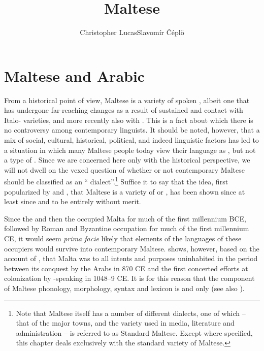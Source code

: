 \documentclass[output=paper]{langsci/langscibook}
\title{Maltese}
\author{Christopher Lucas\affiliation{SOAS University of London}\lastand Slavomír Čéplö\affiliation{Institute of Oriental Studies, Slovak Academy of Sciences/IMAFO Abteilung Byzanzforschung, Österreichische Akademie der Wissenschaften}}
\begin{document}
\maketitle
\section{Maltese and Arabic} %
From a historical point of view, Maltese is a variety of spoken , albeit one that has undergone far-reaching changes as a result of sustained and  contact with Italo- varieties, and more recently also with . This is a fact about which there is no controversy among contemporary linguists. It should be noted, however, that a mix of social, cultural, historical, political, and indeed linguistic factors has led to a situation in which many Maltese people today view their language as , but not a type of . Since we are concerned here only with the historical perspective, we will not dwell on the vexed question of whether or not contemporary Maltese should be classified as an `` dialect''.\footnote{Note that Maltese itself has a number of different dialects, one of which -- that of the major towns, and the variety used in media, literature and administration -- is referred to as  Standard Maltese. Except where specified, this chapter deals exclusively with the standard variety of Maltese.} Suffice it to say that the idea, first popularized by \cite{desoldanis1750} and \cite{vassalli1791}, that Maltese is a variety of  or , has been shown since at least since \cite{gesenius1810} and \cite{desacy1829} to be entirely without merit.

Since the  and then the  occupied Malta for much of the first millennium BCE, followed by Roman and Byzantine occupation for much of the first millennium CE, it would seem \textit{prima facie} likely that elements of the languages of these occupiers would survive into contemporary Maltese. \cite{brincat1995} shows, however, based on the account of , that Malta was to all intents and purposes uninhabited in the period between its conquest by the Arabs in 870 CE and the first concerted efforts at colonization by -speaking  in 1048--9 CE. It is for this reason that the  component of Maltese phonology, morphology, syntax and lexicon is  and  only (see also \citealt{grech1961}).
\end{document}
